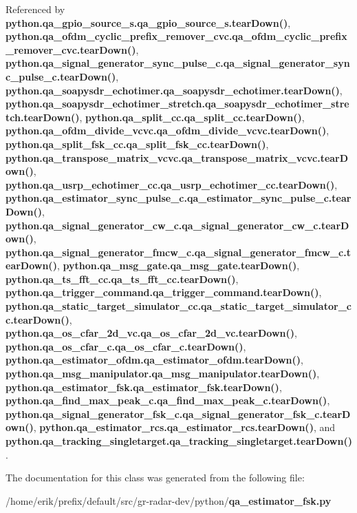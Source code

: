 Referenced by {\bf python.\+qa\+\_\+gpio\+\_\+source\+\_\+s.\+qa\+\_\+gpio\+\_\+source\+\_\+s.\+tear\+Down()}, {\bf python.\+qa\+\_\+ofdm\+\_\+cyclic\+\_\+prefix\+\_\+remover\+\_\+cvc.\+qa\+\_\+ofdm\+\_\+cyclic\+\_\+prefix\+\_\+remover\+\_\+cvc.\+tear\+Down()}, {\bf python.\+qa\+\_\+signal\+\_\+generator\+\_\+sync\+\_\+pulse\+\_\+c.\+qa\+\_\+signal\+\_\+generator\+\_\+sync\+\_\+pulse\+\_\+c.\+tear\+Down()}, {\bf python.\+qa\+\_\+soapysdr\+\_\+echotimer.\+qa\+\_\+soapysdr\+\_\+echotimer.\+tear\+Down()}, {\bf python.\+qa\+\_\+soapysdr\+\_\+echotimer\+\_\+stretch.\+qa\+\_\+soapysdr\+\_\+echotimer\+\_\+stretch.\+tear\+Down()}, {\bf python.\+qa\+\_\+split\+\_\+cc.\+qa\+\_\+split\+\_\+cc.\+tear\+Down()}, {\bf python.\+qa\+\_\+ofdm\+\_\+divide\+\_\+vcvc.\+qa\+\_\+ofdm\+\_\+divide\+\_\+vcvc.\+tear\+Down()}, {\bf python.\+qa\+\_\+split\+\_\+fsk\+\_\+cc.\+qa\+\_\+split\+\_\+fsk\+\_\+cc.\+tear\+Down()}, {\bf python.\+qa\+\_\+transpose\+\_\+matrix\+\_\+vcvc.\+qa\+\_\+transpose\+\_\+matrix\+\_\+vcvc.\+tear\+Down()}, {\bf python.\+qa\+\_\+usrp\+\_\+echotimer\+\_\+cc.\+qa\+\_\+usrp\+\_\+echotimer\+\_\+cc.\+tear\+Down()}, {\bf python.\+qa\+\_\+estimator\+\_\+sync\+\_\+pulse\+\_\+c.\+qa\+\_\+estimator\+\_\+sync\+\_\+pulse\+\_\+c.\+tear\+Down()}, {\bf python.\+qa\+\_\+signal\+\_\+generator\+\_\+cw\+\_\+c.\+qa\+\_\+signal\+\_\+generator\+\_\+cw\+\_\+c.\+tear\+Down()}, {\bf python.\+qa\+\_\+signal\+\_\+generator\+\_\+fmcw\+\_\+c.\+qa\+\_\+signal\+\_\+generator\+\_\+fmcw\+\_\+c.\+tear\+Down()}, {\bf python.\+qa\+\_\+msg\+\_\+gate.\+qa\+\_\+msg\+\_\+gate.\+tear\+Down()}, {\bf python.\+qa\+\_\+ts\+\_\+fft\+\_\+cc.\+qa\+\_\+ts\+\_\+fft\+\_\+cc.\+tear\+Down()}, {\bf python.\+qa\+\_\+trigger\+\_\+command.\+qa\+\_\+trigger\+\_\+command.\+tear\+Down()}, {\bf python.\+qa\+\_\+static\+\_\+target\+\_\+simulator\+\_\+cc.\+qa\+\_\+static\+\_\+target\+\_\+simulator\+\_\+cc.\+tear\+Down()}, {\bf python.\+qa\+\_\+os\+\_\+cfar\+\_\+2d\+\_\+vc.\+qa\+\_\+os\+\_\+cfar\+\_\+2d\+\_\+vc.\+tear\+Down()}, {\bf python.\+qa\+\_\+os\+\_\+cfar\+\_\+c.\+qa\+\_\+os\+\_\+cfar\+\_\+c.\+tear\+Down()}, {\bf python.\+qa\+\_\+estimator\+\_\+ofdm.\+qa\+\_\+estimator\+\_\+ofdm.\+tear\+Down()}, {\bf python.\+qa\+\_\+msg\+\_\+manipulator.\+qa\+\_\+msg\+\_\+manipulator.\+tear\+Down()}, {\bf python.\+qa\+\_\+estimator\+\_\+fsk.\+qa\+\_\+estimator\+\_\+fsk.\+tear\+Down()}, {\bf python.\+qa\+\_\+find\+\_\+max\+\_\+peak\+\_\+c.\+qa\+\_\+find\+\_\+max\+\_\+peak\+\_\+c.\+tear\+Down()}, {\bf python.\+qa\+\_\+signal\+\_\+generator\+\_\+fsk\+\_\+c.\+qa\+\_\+signal\+\_\+generator\+\_\+fsk\+\_\+c.\+tear\+Down()}, {\bf python.\+qa\+\_\+estimator\+\_\+rcs.\+qa\+\_\+estimator\+\_\+rcs.\+tear\+Down()}, and {\bf python.\+qa\+\_\+tracking\+\_\+singletarget.\+qa\+\_\+tracking\+\_\+singletarget.\+tear\+Down()}.



The documentation for this class was generated from the following file\+:\begin{DoxyCompactItemize}
\item 
/home/erik/prefix/default/src/gr-\/radar-\/dev/python/{\bf qa\+\_\+estimator\+\_\+fsk.\+py}\end{DoxyCompactItemize}
